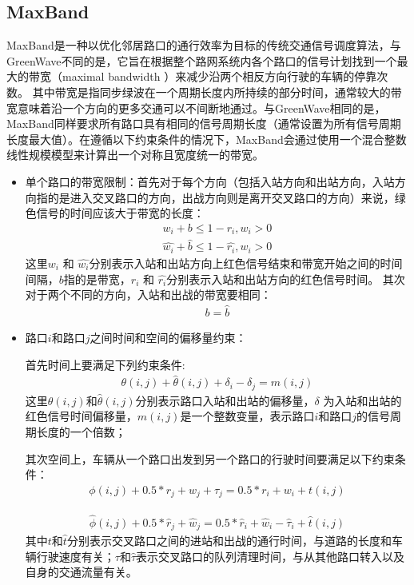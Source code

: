 \subsection{MaxBand}
MaxBand\cite{little1981maxband}是一种以优化邻居路口的通行效率为目标的传统交通信号调度算法，与GreenWave不同的是，它旨在根据整个路网系统内各个路口的信号计划找到一个最大的带宽（maximal bandwidth ）来减少沿两个相反方向行驶的车辆的停靠次数。
其中带宽是指同步绿波在一个周期长度内所持续的部分时间，通常较大的带宽意味着沿一个方向的更多交通可以不间断地通过。与GreenWave相同的是，MaxBand同样要求所有路口具有相同的信号周期长度（通常设置为所有信号周期长度最大值）。在遵循以下约束条件的情况下，MaxBand会通过使用一个混合整数线性规模模型来计算出一个对称且宽度统一的带宽。
\begin{itemize}
    \item 单个路口的带宽限制：首先对于每个方向（包括入站方向和出站方向，入站方向指的是进入交叉路口的方向，出战方向则是离开交叉路口的方向）来说，绿色信号的时间应该大于带宽的长度：
    \begin{align}
        \label{eq:band-cons-1}
        w_i + b \leq 1- r_i, w_i > 0
    \end{align}
    \begin{align}
        \label{eq:band-cons-2}
        \hat{w_i} + \hat{b} \leq 1- \hat{r_i}, w_i > 0
    \end{align}
    这里$w_i$ 和 $\hat{w_i}$分别表示入站和出站方向上红色信号结束和带宽开始之间的时间间隔，$b$指的是带宽，$r_i$ 和 $\hat{r_i}$分别表示入站和出站方向的红色信号时间。
    其次对于两个不同的方向，入站和出战的带宽要相同：
    \begin{align}
        \label{eq:band-cons-3}
        b = \hat{b}
    \end{align}
    \item 路口$i$和路口$j$之间时间和空间的偏移量约束：

    首先时间上要满足下列约束条件:
    \begin{align}
        \label{eq:temporal-cons}
        \theta(i,j) + \hat{\theta}(i,j) + \delta_i - \delta_j = m(i,j)
    \end{align}
    这里$\theta(i,j)$和$\hat{\theta}(i,j)$分别表示路口入站和出站的偏移量，$\delta$ 为入站和出站的红色信号时间偏移量，$m(i,j)$是一个整数变量，表示路口$i$和路口$j$的信号周期长度的一个倍数；
    
    其次空间上，车辆从一个路口出发到另一个路口的行驶时间要满足以下约束条件：
    \begin{align}
        \label{eq:spataril-cons-1}
        \phi(i, j)+0.5 * r_{j}+w_{j}+\tau_{j}=0.5 * r_{i}+w_{i}+t(i, j)
    \end{align}

    \begin{align}
        \label{eq:spataril-cons-2}
        \hat{\phi}(i, j)+0.5 * \hat{r}_{j}+\hat{w}_{j}=0.5 * \hat{r}_{i}+\hat{w}_{i}-\hat{\tau}_{i}+\hat{t}(i, j)
    \end{align}
    其中$t$和$\hat{t}$分别表示交叉路口之间的进站和出战的通行时间，与道路的长度和车辆行驶速度有关；$\tau \text{和} \hat{\tau}$表示交叉路口的队列清理时间，与从其他路口转入以及自身的交通流量有关。
\end{itemize}
